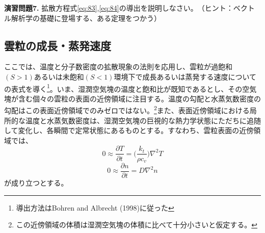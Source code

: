 \documentclass{ltjsarticle}
\begin{document}
\begin{itembox}[l]{\bf{演習問題7.}}
拡散方程式\eqref{eq:83},\eqref{eq:84}の導出を説明しなさい。　（ヒント：ベクトル解析学の基礎に登場する、ある定理をつかう）
\end{itembox}


\subsection{雲粒の成長・蒸発速度}
ここでは、温度と分子数密度の拡散現象の法則を応用し、雲粒が過飽和$(S>1)$あるいは未飽和$(S<1)$環境下で成長あるいは蒸発する速度についての表式を導く\footnote{導出方法はBohren and Albrecht (1998)に従った}。いま、湿潤空気塊の温度と飽和比が既知であるとし、その空気塊が含む個々の雲粒の表面の近傍領域に注目する。温度の勾配と水蒸気数密度の勾配はこの表面近傍領域でのみゼロではない。\footnote{この近傍領域の体積は湿潤空気塊の体積に比べて十分小さいと仮定する。}また、表面近傍領域における局所的な温度と水蒸気数密度は、湿潤空気塊の巨視的な熱力学状態にただちに追随して変化し、各瞬間で定常状態にあるものとする。すなわち、雲粒表面の近傍領域では、
\begin{equation}\label{eq:85}
0\approx \frac{\partial T}{\partial t}= {\bigg (}\frac{k_{t}}{\rho c_{v}}{\bigg )}\nabla^{2}T
\end{equation}
\begin{equation}\label{eq:86}
0\approx \frac{\partial n}{\partial t}= D\nabla^{2}n
\end{equation}
が成り立つとする。
\end{document}
